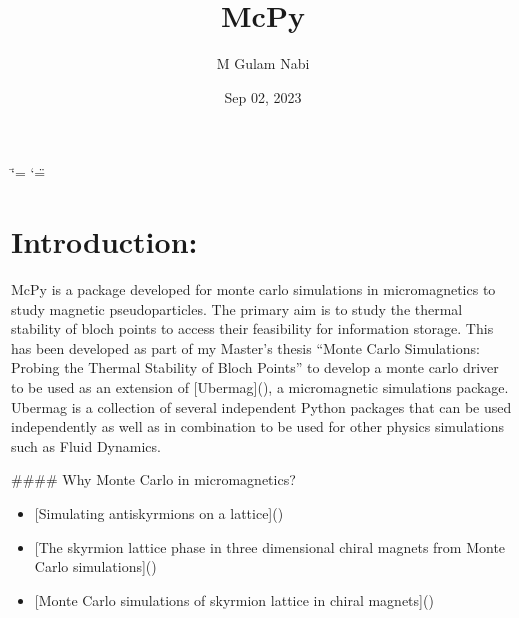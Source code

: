 \documentclass[letterpaper,10pt,english]{sphinxmanual}
\title{McPy}
\date{Sep 02, 2023}
\author{M Gulam Nabi}
\begin{document}
\ifdefined\shorthandoff
  \ifnum\catcode`\=\string=\active\shorthandoff{=}\fi
  \ifnum\catcode`\"=\active{}\fi
\fi

\pagestyle{empty}
\sphinxmaketitle
\pagestyle{plain}
\sphinxtableofcontents
\pagestyle{normal}
\label{\detokenize{index::doc}}



\chapter{Introduction:}
\label{\detokenize{index:introduction}}
\sphinxAtStartPar
McPy is a package developed for monte carlo simulations in micromagnetics to study magnetic pseudoparticles. The primary aim is to study the thermal stability of bloch points to access their feasibility for information storage.
This has been developed as part of my Master’s thesis “Monte Carlo Simulations: Probing the Thermal Stability of Bloch Points” to develop a monte carlo driver to be used as an extension of {[}Ubermag{]}(), a micromagnetic simulations package. Ubermag is a collection of several independent Python packages that can be used independently as well as in combination to be used for other physics simulations such as Fluid Dynamics.

\sphinxAtStartPar
\#\#\#\# Why Monte Carlo in micromagnetics?
\begin{description}
\begin{itemize}
\item {} 
\sphinxAtStartPar
{[}Simulating anti\sphinxhyphen{}skyrmions on a lattice{]}()

\item {} 
\sphinxAtStartPar
{[}The skyrmion lattice phase in three dimensional chiral magnets from Monte Carlo simulations{]}()

\item {} 
\sphinxAtStartPar
{[}Monte Carlo simulations of skyrmion lattice in chiral magnets{]}()

\end{itemize}

\end{description}
\end{document}
